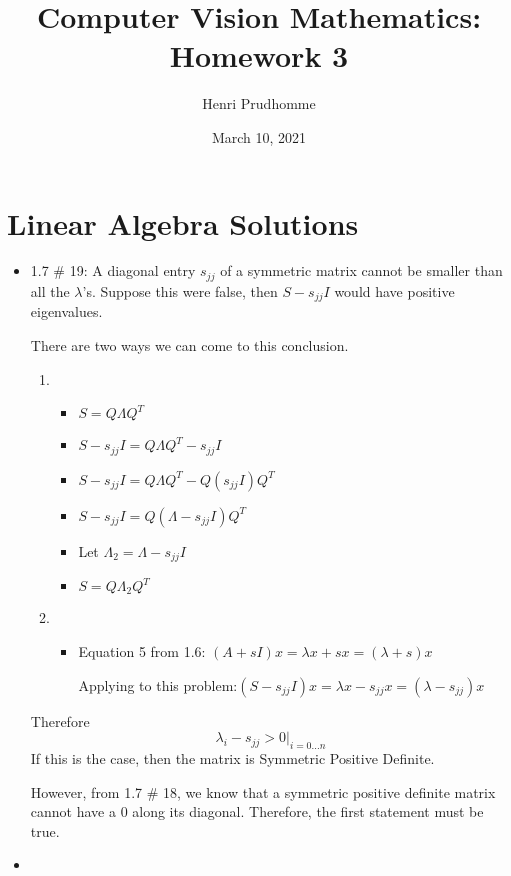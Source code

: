 \documentclass[12pt]{article}%
\title{Computer Vision Mathematics: Homework 3}
\author{Henri Prudhomme}
\date{March 10, 2021}
\begin{document}
\maketitle

\section{Linear Algebra Solutions}

\begin{itemize}
\item 1.7 \# 19: 
A diagonal entry $s_{jj}$ of a symmetric matrix cannot be smaller than all the $\lambda$'s.
Suppose this were false, then $S-s_{jj}I$ would have positive eigenvalues. 

There are two ways we can come to this conclusion.

\begin{enumerate}
\item
\begin{itemize}
\item[] $S = Q\Lambda Q^T$
\item[] $S-s_{jj}I = Q\Lambda Q^T - s_{jj}I$
\item[] $S-s_{jj}I = Q\Lambda Q^T - Q(s_{jj}I)Q^T$
\item[] $S-s_{jj}I = Q(\Lambda -s_{jj}I)Q^T$
\item[] Let $\Lambda_2 = \Lambda -s_{jj}I$
\item[] $S = Q\Lambda_2 Q^T$
\end{itemize}
\item
\begin{itemize}
\item[] Equation 5 from 1.6: $(A + s I)x = \lambda x + s x = (\lambda + s)x$

Applying to this problem:$(S-s_{jj}I)x = \lambda x -s_{jj} x = (\lambda - s_{jj}) x$
\end{itemize}
\end{enumerate}

Therefore $$\lambda_i - s_{jj} > 0 |_{i=0...n}$$
If this is the case, then the matrix is Symmetric Positive Definite.

However, from 1.7 \# 18, we know that a symmetric positive definite matrix cannot have a $0$ along its diagonal. Therefore, the first statement must be true.

\item 
\end{itemize}
\end{document}

